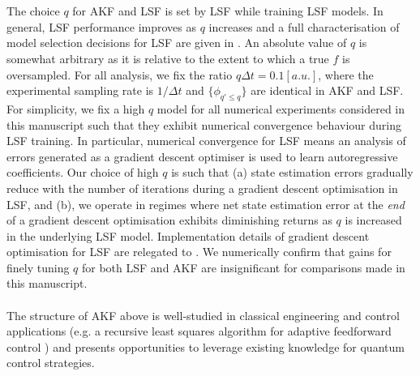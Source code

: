 \\
\\
The choice $q$ for AKF and LSF is set by LSF while training LSF models. In general, LSF performance improves as $q$ increases and a full characterisation of model selection decisions for LSF are given in \cite{mavadia2017}. An absolute value of $q$ is somewhat arbitrary as it is relative to the extent to which a true $f$ is oversampled. For all analysis, we fix the ratio $q \Delta t = 0.1 [a.u.]$, where the experimental sampling rate is $1/\Delta t$ and $\{\phi_{q' \leq q}\}$ are identical in AKF and LSF. For simplicity, we fix a high $q$ model for all numerical experiments considered in this manuscript such that they exhibit numerical convergence behaviour during LSF training. In particular, numerical convergence for LSF means an analysis of errors generated as a gradient descent optimiser is used to learn autoregressive coefficients. Our choice of high $q$ is such that (a) state estimation errors gradually reduce with the number of iterations during a gradient descent optimisation in LSF, and (b), we operate in regimes where net state estimation error at the \textit{end} of a gradient descent optimisation exhibits diminishing returns as $q$ is increased in the underlying LSF model. Implementation details of gradient descent optimisation for LSF are relegated to \cite{mavadia2017}. We numerically confirm that gains for finely tuning $q$ for both LSF and AKF are insignificant for comparisons made in this manuscript.
\\
\\
The structure of AKF above is well-studied in classical engineering and control applications (e.g. a recursive least squares algorithm for adaptive feedforward control \cite{moon2006real} ) and presents opportunities to leverage existing knowledge for quantum control strategies.

